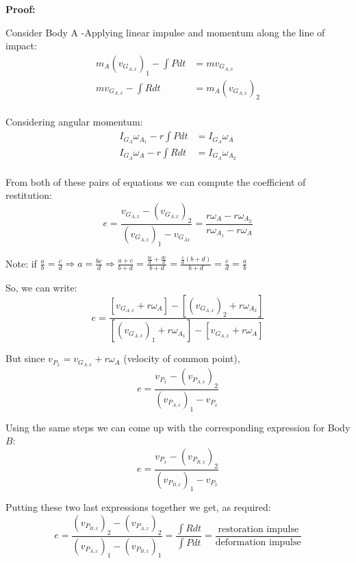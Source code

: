 \documentclass[12pt,letterpaper,twoside]{report}
\begin{document}
\newpage

\textbf{Proof:}

Consider Body A -Applying linear impulse and momentum along the line of impact:
\begin{align*}
m_A ( v_{G_{A,x}})_1 - \int P dt &= m v_{G_{A,x}}\\
m v_{G_{A,x}} - \int R dt &= m_A ( v_{G_{A,x}})_2\\
\end{align*}

\vspace*{4\baselineskip}

Considering angular momentum:
\begin{align*}
I_{G_A} \omega_{A_1} - r \int P dt &= I_{G_A} \omega_A\\
I_{G_A} \omega_A -  r \int R dt &= I_{G_A} \omega_{A_2}\\
\end{align*}

\vspace*{2\baselineskip}

From both of these pairs of equations we can compute the coefficient of restitution:
\[
e = \frac{v_{G_{A,x}} - (v_{G_{A,x}})_2}{(v_{G_{A,x}})_1 - v_{G_{Ax}}} = \frac{r \omega_A - r \omega_{A_2}}{r \omega_{A_1} - r \omega_A}
\]

\begin{center}
Note: if $\displaystyle \frac{a}{b} = \frac{c}{d} \Rightarrow a = \frac{bc}{d} \Rightarrow \frac{a+c}{b+d} = \frac{\displaystyle \frac{bc}{d} + \frac{dc}{d}}{b+d} = \frac{\displaystyle  \frac{c}{d}(b+d)}{b+d} = \frac{c}{d} = \frac{a}{b}$
\end{center}


So, we can write:
\[ e = \frac{[v_{G_{A,x}} + r \omega_A] - [(v_{G_{A,x}})_2 + r \omega_{A_2}]}{[(v_{G_{A,x}})_1 + r \omega_{A_1}] - [v_{G_{A,x}} + r \omega_A]}
\]


But since $v_{P_x} = v_{G_{A,x}} + r \omega_A$ (velocity of common point), 
\[
e = \frac{v_{P_x} - (v_{P_{A,x}})_2}{(v_{P_{A,x}})_1 - v_{P_x}}
\]


Using the same steps we can come up with the corresponding expression for Body $B$:
\[
e = \frac{v_{P_x} - (v_{P_{B,x}})_2}{(v_{P_{B,x}})_1 - v_{P_x}}
\]

Putting these two last expressions together we get, as required:
\[
e = \displaystyle \frac{ \displaystyle (v_{P_{B,x}})_2 - (v_{P_{A,x}})_2}{ \displaystyle (v_{P_{A,x}})_1 - (v_{P_{B,x}})_1} = \frac{\displaystyle \int R dt}{\displaystyle \int P dt} = \frac{\text{restoration impulse}}{\text{deformation impulse}}
\]
\end{document}
